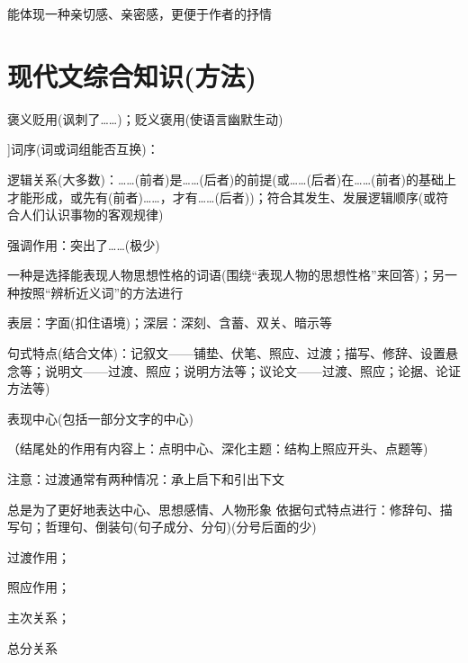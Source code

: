 能体现一种亲切感、亲密感，更便于作者的抒情

\section{现代文综合知识(方法)}

褒义贬用(讽刺了\ldots{}\ldots{})；贬义褒用(使语言幽默生动)

\hatsubsection[\hatb[6]{2}{2011-06-13}]{词序(词或词组能否互换)：}
\begin{asparaenum}[(1)]
\item 逻辑关系(大多数)：\ldots{}\ldots{}(前者)是\ldots{}\ldots{}(后者)的前提(或\ldots{}\ldots{}(后者)在\ldots{}\ldots{}(前者)的基础上才能形成，或先有(前者)\ldots{}\ldots{}，才有\ldots{}\ldots{}(后者))；符合其发生、发展逻辑顺序(或符合人们认识事物的客观规律)
\item 强调作用：突出了\ldots{}\ldots{}(极少)
\end{asparaenum}

一种是选择能表现人物思想性格的词语(围绕``表现人物的思想性格''来回答)；另一种按照``辨析近义词''的方法进行

表层：字面(扣住语境)；深层：深刻、含蓄、双关、暗示等

\begin{asparaenum}[(1)]
\item 句式特点(结合文体)：记叙文——铺垫、伏笔、照应、过渡；描写、修辞、设置悬念等；说明文——过渡、照应；说明方法等；议论文——过渡、照应；论据、论证方法等)
\item 表现中心(包括一部分文字的中心)
\end{asparaenum}
（结尾处的作用有内容上：点明中心、深化主题：结构上照应开头、点题等)\par
注意：过渡通常有两种情况：承上启下和引出下文

总是为了更好地表达中心、思想感情、人物形象
依据句式特点进行：修辞句、描写句；哲理句、倒装句(句子成分、分句)(分号后面的少)


\begin{asparaenum}[(1)]
\item 过渡作用；
\item 照应作用；
\item 主次关系；
\item 总分关系
\end{asparaenum}

